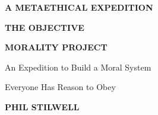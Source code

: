 \frontmatter
\begin{titlepage}
\thispagestyle{empty}
\vspace*{0.08\textheight}
{\sffamily\bfseries\small\color{PaletteRed}\MakeUppercase{A metaethical expedition}\par}
\vspace{1em}
{\sffamily\bfseries\fontsize{38}{41}\selectfont\color{PaletteInk} THE OBJECTIVE\par}
\vspace{0.12em}
{\sffamily\bfseries\fontsize{38}{41}\selectfont\color{PaletteInk} MORALITY PROJECT\par}
\vspace{1.25em}
\chapterornament
\vspace{1.45em}
{\displayfont\Large\color{PaletteOlive} An Expedition to Build a Moral System\par}
\vspace{0.25em}
{\displayfont\Large\color{PaletteOlive} Everyone Has Reason to Obey\par}
\vfill
\noindent\colorbox{PaletteInk}{%
  \parbox{\dimexpr\textwidth-2\fboxsep\relax}{%
    \vspace{0.7em}\centering\sffamily\bfseries\large\color{PalettePaper} PHIL STILWELL\par\vspace{0.7em}%
  }%
}
\vspace*{0.06\textheight}
\end{titlepage}

